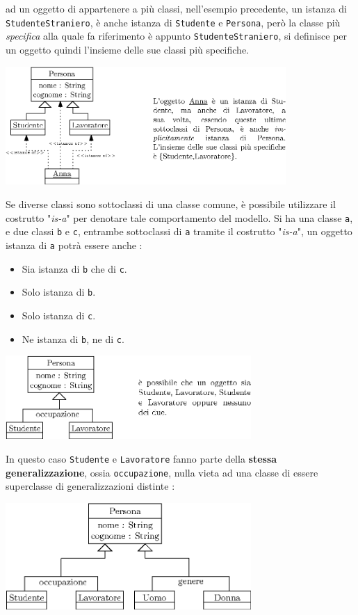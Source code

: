 \documentclass[12pt, letterpaper]{article}
\newcommand{\code}[1]{\colorbox{light-gray}{\texttt{#1}}}
\begin{document}
ad un oggetto di appartenere a più classi, nell'esempio precedente, un istanza di \code{StudenteStraniero}, è anche
istanza di \code{Studente} e \code{Persona}, però la classe più \textit{specifica} alla quale fa riferimento è appunto
\code{StudenteStraniero}, si definisce per un oggetto quindi l'insieme delle sue classi più specifiche.
\begin{center}
    \includegraphics[width=0.8\textwidth ]{images/ClassiSpec.eps}
\end{center}
Se diverse classi sono sottoclassi di una classe comune, è possibile utilizzare il costrutto "\textit{is-a}" per
denotare tale comportamento del modello. Si ha una classe \code{a}, e due classi \code{b} e \code{c}, entrambe
sottoclassi di \code{a} tramite il costrutto "\textit{is-a}", un oggetto istanza di \code{a} potrà essere anche :\begin{itemize}
    \item Sia istanza di \code{b} che di \code{c}.
    \item Solo istanza di \code{b}.
    \item Solo istanza di \code{c}.
    \item Ne istanza di \code{b}, ne di \code{c}.
\end{itemize}\begin{center}
    \includegraphics[width=0.7\textwidth ]{images/isa.eps}
\end{center}
In questo caso \code{Studente} e \code{Lavoratore} fanno parte della \textbf{stessa generalizzazione}, ossia \code{occupazione},
nulla vieta ad una classe di essere superclasse di generalizzazioni distinte : \begin{center}
    \includegraphics[width=0.7\textwidth ]{images/isa2.eps}
\end{center}
\end{document}
